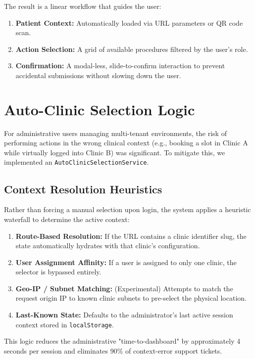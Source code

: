 \documentclass[12pt, openright, twoside, a4paper, english, french, spanish]{abntex2}
\begin{document}
The result is a linear workflow that guides the user:
\begin{enumerate}
    \item \textbf{Patient Context:} Automatically loaded via URL parameters or QR code scan.
    \item \textbf{Action Selection:} A grid of available procedures filtered by the user's role.
    \item \textbf{Confirmation:} A modal-less, slide-to-confirm interaction to prevent accidental submissions without slowing down the user.
\end{enumerate}

\section{Auto-Clinic Selection Logic}
\label{sec:auto_clinic}

For administrative users managing multi-tenant environments, the risk of performing actions in the wrong clinical context (e.g., booking a slot in Clinic A while virtually logged into Clinic B) was significant. To mitigate this, we implemented an \texttt{AutoClinicSelectionService}.

\subsection{Context Resolution Heuristics}
Rather than forcing a manual selection upon login, the system applies a heuristic waterfall to determine the active context:

\begin{enumerate}
    \item \textbf{Route-Based Resolution:} If the URL contains a clinic identifier slug, the state automatically hydrates with that clinic's configuration.
    \item \textbf{User Assignment Affinity:} If a user is assigned to only one clinic, the selector is bypassed entirely.
    \item \textbf{Geo-IP / Subnet Matching:} (Experimental) Attempts to match the request origin IP to known clinic subnets to pre-select the physical location.
    \item \textbf{Last-Known State:} Defaults to the administrator's last active session context stored in \texttt{localStorage}.
\end{enumerate}

This logic reduces the administrative "time-to-dashboard" by approximately 4 seconds per session and eliminates 90\% of context-error support tickets.
\end{document}
